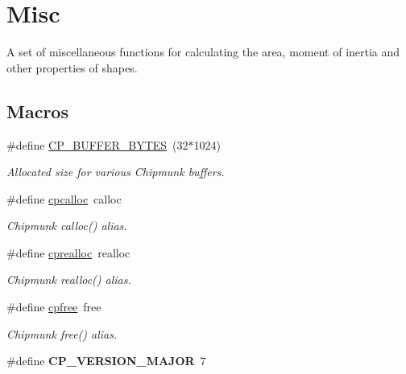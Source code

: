 \hypertarget{group__misc}{}\section{Misc}
\label{group__misc}


A set of miscellaneous functions for calculating the area, moment of inertia and other properties of shapes.  


\subsection*{Macros}
\begin{DoxyCompactItemize}
\item 
\hypertarget{group__misc_ga6d034fec4d7962b6f20f9e243527c560}{}\#define \hyperlink{group__misc_ga6d034fec4d7962b6f20f9e243527c560}{C\+P\+\_\+\+B\+U\+F\+F\+E\+R\+\_\+\+B\+Y\+T\+E\+S}~(32$\ast$1024)\label{group__misc_ga6d034fec4d7962b6f20f9e243527c560}

\begin{DoxyCompactList}\small\item\em Allocated size for various Chipmunk buffers. \end{DoxyCompactList}\item 
\hypertarget{group__misc_gac88bab87ecc7db6cc222679bf6082e9b}{}\#define \hyperlink{group__misc_gac88bab87ecc7db6cc222679bf6082e9b}{cpcalloc}~calloc\label{group__misc_gac88bab87ecc7db6cc222679bf6082e9b}

\begin{DoxyCompactList}\small\item\em Chipmunk calloc() alias. \end{DoxyCompactList}\item 
\hypertarget{group__misc_gab3544b888840ed34e49bb0559d6849a8}{}\#define \hyperlink{group__misc_gab3544b888840ed34e49bb0559d6849a8}{cprealloc}~realloc\label{group__misc_gab3544b888840ed34e49bb0559d6849a8}

\begin{DoxyCompactList}\small\item\em Chipmunk realloc() alias. \end{DoxyCompactList}\item 
\hypertarget{group__misc_ga14627263deb67605201281bac734eb04}{}\#define \hyperlink{group__misc_ga14627263deb67605201281bac734eb04}{cpfree}~free\label{group__misc_ga14627263deb67605201281bac734eb04}

\begin{DoxyCompactList}\small\item\em Chipmunk free() alias. \end{DoxyCompactList}\item 
\hypertarget{group__misc_gac02132b57a51a1c26ff6fb11dc046c04}{}\#define {\bfseries C\+P\+\_\+\+V\+E\+R\+S\+I\+O\+N\+\_\+\+M\+A\+J\+O\+R}~7\label{group__misc_gac02132b57a51a1c26ff6fb11dc046c04}


\end{DoxyCompactItemize}
